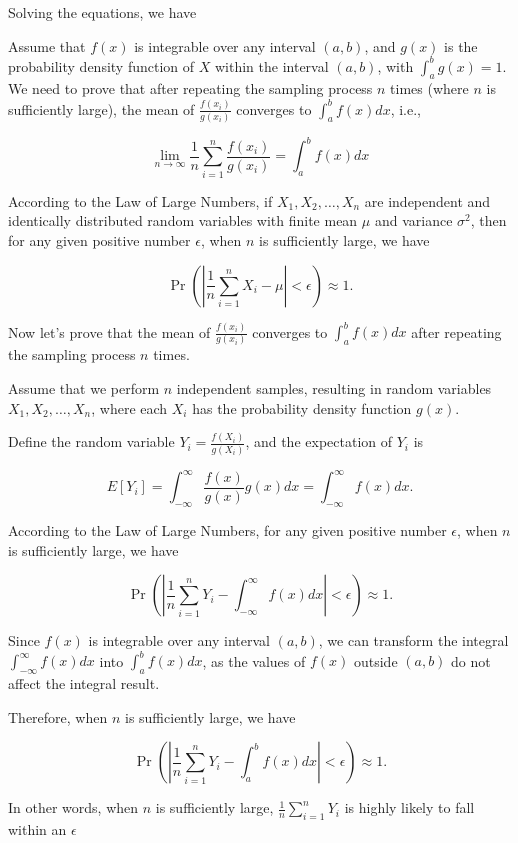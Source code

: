 \documentclass[11pt]{article}
\begin{document}
Solving the equations, we have

Assume that $f(x)$ is integrable over any interval $(a, b)$, and $g(x)$ is the probability density function of $X$ within the interval $(a, b)$, with $\int_{a}^{b}g(x)=1$. We need to prove that after repeating the sampling process $n$ times (where $n$ is sufficiently large), the mean of $\frac{f(x_i)}{g(x_i)}$ converges to $\int_{a}^{b}f(x)dx$, i.e.,

\begin{equation}
    \lim_{n\to\infty}\frac{1}{n}\sum_{i=1}^{n}\frac{f(x_i)}{g(x_i)} = \int_{a}^{b}f(x)dx
\end{equation}

According to the Law of Large Numbers, if $X_1, X_2, \ldots, X_n$ are independent and identically distributed random variables with finite mean $\mu$ and variance $\sigma^2$, then for any given positive number $\epsilon$, when $n$ is sufficiently large, we have

\begin{equation}
\Pr\left(\left|\frac{1}{n}\sum_{i=1}^{n}X_i - \mu\right| < \epsilon\right) \approx 1.
\end{equation}

Now let's prove that the mean of $\frac{f(x_i)}{g(x_i)}$ converges to $\int_{a}^{b}f(x)dx$ after repeating the sampling process $n$ times.

Assume that we perform $n$ independent samples, resulting in random variables $X_1, X_2, \ldots, X_n$, where each $X_i$ has the probability density function $g(x)$.

Define the random variable $Y_i = \frac{f(X_i)}{g(X_i)}$, and the expectation of $Y_i$ is

\begin{equation}
E[Y_i] = \int_{-\infty}^{\infty}\frac{f(x)}{g(x)}g(x)dx = \int_{-\infty}^{\infty}f(x)dx.
\end{equation}

According to the Law of Large Numbers, for any given positive number $\epsilon$, when $n$ is sufficiently large, we have

\begin{equation}
\Pr\left(\left|\frac{1}{n}\sum_{i=1}^{n}Y_i - \int_{-\infty}^{\infty}f(x)dx\right| < \epsilon\right) \approx 1.
\end{equation}

Since $f(x)$ is integrable over any interval $(a, b)$, we can transform the integral $\int_{-\infty}^{\infty}f(x)dx$ into $\int_{a}^{b}f(x)dx$, as the values of $f(x)$ outside $(a, b)$ do not affect the integral result.

Therefore, when $n$ is sufficiently large, we have

\begin{equation}
\Pr\left(\left|\frac{1}{n}\sum_{i=1}^{n}Y_i - \int_{a}^{b}f(x)dx\right| < \epsilon\right) \approx 1.
\end{equation}

In other words, when $n$ is sufficiently large, $\frac{1}{n}\sum_{i=1}^{n}Y_i$ is highly likely to fall within an $\epsilon$
\end{document}
